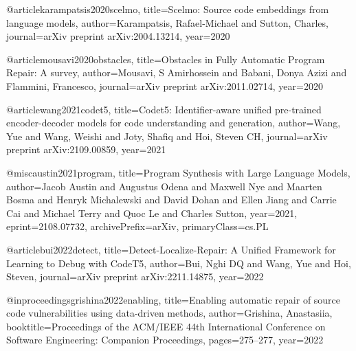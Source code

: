 @article{karampatsis2020scelmo,
  title={Scelmo: Source code embeddings from language models},
  author={Karampatsis, Rafael-Michael and Sutton, Charles},
  journal={arXiv preprint arXiv:2004.13214},
  year={2020}
}

@article{mousavi2020obstacles,
  title={Obstacles in Fully Automatic Program Repair: A survey},
  author={Mousavi, S Amirhossein and Babani, Donya Azizi and Flammini, Francesco},
  journal={arXiv preprint arXiv:2011.02714},
  year={2020}
}


@article{wang2021codet5,
  title={Codet5: Identifier-aware unified pre-trained encoder-decoder models for code understanding and generation},
  author={Wang, Yue and Wang, Weishi and Joty, Shafiq and Hoi, Steven CH},
  journal={arXiv preprint arXiv:2109.00859},
  year={2021}
}

@misc{austin2021program,
      title={Program Synthesis with Large Language Models},
      author={Jacob Austin and Augustus Odena and Maxwell Nye and Maarten Bosma and Henryk Michalewski and David Dohan and Ellen Jiang and Carrie Cai and Michael Terry and Quoc Le and Charles Sutton},
      year={2021},
      eprint={2108.07732},
      archivePrefix={arXiv},
      primaryClass={cs.PL}
}


@article{bui2022detect,
  title={Detect-Localize-Repair: A Unified Framework for Learning to Debug with CodeT5},
  author={Bui, Nghi DQ and Wang, Yue and Hoi, Steven},
  journal={arXiv preprint arXiv:2211.14875},
  year={2022}
}

@inproceedings{grishina2022enabling,
  title={Enabling automatic repair of source code vulnerabilities using data-driven methods},
  author={Grishina, Anastasiia},
  booktitle={Proceedings of the ACM/IEEE 44th International Conference on Software Engineering: Companion Proceedings},
  pages={275--277},
  year={2022}
}

